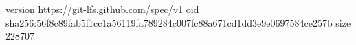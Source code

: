 version https://git-lfs.github.com/spec/v1
oid sha256:56f8c89fab5f1cc1a56119fa789284c007fc88a671cd1dd3e9e0697584ce257b
size 228707
